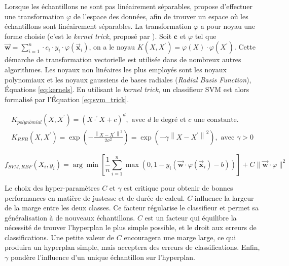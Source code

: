 Lorsque les échantillons ne sont pas linéairement séparables, \cite{boser_training_1992} propose d'effectuer une transformation $\varphi$ de l'espace des données, afin de trouver un espace où les échantillons sont linéairement séparables.
La transformation $\varphi$ a pour noyau une forme choisie (c'est le \textit{kernel trick}, proposé par \cite{aizerman_theoretical_1964}).
Soit $\mathbf{c}$ et $\varphi$ tel que $\vec{\mathbf{w}}=\sum_{i=1}^{n} \cdot c_{i} \cdot y_{i} \cdot \varphi\left(\vec{\mathbf{x}}_{i}\right)$, on a le noyau $K\left(X, X^{\prime}\right) = \varphi \left(X\right) \cdot \varphi\left(X^{\prime}\right)$.
Cette démarche de transformation vectorielle est utilisée dans de nombreux autres algorithmes.
Les noyaux non linéaires les plus employés sont les noyaux polynomiaux et les noyaux gaussiens de bases radiales (\textit{Radial Basis Function}), Équations \ref{eq:kernels}.
En utilisant le \textit{kernel trick}, un classifieur SVM est alors formalisé par l'Équation \ref{eq:svm_trick}.

\begin{equation} \label{eq:kernels}
\begin{split}
K_{polyn\hat{o}mial}\left(X, X^{\prime}\right) = \left(X \cdot ^{\prime} X + c\right)^{d}, \text{ avec } d \text{ le degré et } c \text{ une constante}.
\\
K_{RFB}\left(X, X^{\prime}\right) = \exp \left(-\frac{\left\|X-X^{\prime}\right\|^{2}}{2 \sigma^{2}}\right) = \exp \left(-\gamma\left\|X-X^{\prime}\right\|^{2}\right), \text{ avec } \gamma > 0
\end{split}
\end{equation}

\begin{equation} \label{eq:svm_trick}
f_{SVM,RBF}(X_i, y_i) = \arg \min \left[\frac{1}{n} \sum_{i=1}^{n} \max \left(0, 1-y_{i}\left(\vec{\mathbf{w}} \cdot \varphi(\vec{\mathbf{x}}_{i})-b\right)\right)\right]+ C \|\vec{\mathbf{w}} \cdot \varphi \|^{2}
\end{equation}

Le choix des hyper-paramètres $C$ et $\gamma$ est critique pour obtenir de bonnes performances en matière de justesse et de durée de calcul.
$C$ influence la largeur de la marge entre les deux classes.
Ce facteur régularise le classifieur et permet sa généralisation à de nouveaux échantillons.
$C$ est un facteur qui équilibre la nécessité de trouver l'hyperplan le plus simple possible, et le droit aux erreurs de classifications.
Une petite valeur de $C$ encouragera une marge large, ce qui produira un hyperplan simple, mais acceptera des erreurs de classifications.
Enfin, $\gamma$ pondère l'influence d'un unique échantillon sur l'hyperplan.

